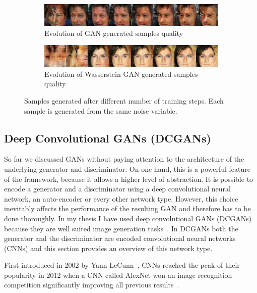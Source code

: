 \begin{figure}
  \begin{subfigure}[b]{\textwidth}
    \includegraphics[width=\textwidth]{figures/gan_progress}
    \caption{Evolution of GAN generated samples quality}
    \label{fig:gan_evolution}
  \end{subfigure}
  \begin{subfigure}[b]{\textwidth}
    \includegraphics[width=\textwidth]{figures/wgan_progress}
    \caption{Evolution of Wasserstein GAN generated samples quality}
    \label{fig:gan_evolution}
  \end{subfigure}
  \caption{Samples generated after different number of training steps. Each sample is generated from the same noise variable.}
  \label{fig:samples_evolution}
\end{figure}

\subsection{Deep Convolutional GANs (DCGANs)}
So far we discussed GANs without paying attention to the architecture of the underlying generator and discriminator. On one hand, this is a powerful feature of the framework, because it allows a higher level of abstraction. It is possible to encode a generator and a discriminator using a deep convolutional neural network, an auto-encoder or every other network type. However, this choice inevitably affects the performance of the resulting GAN and therefore has to be done thoroughly. In my thesis I have used deep convolutional GANs (DCGANs) because they are well suited image generation tasks~\cite{dcgan}. In DCGANs both the generator and the discriminator are encoded convolutional neural networks (CNNs) and this section provides an overview of this network type. 

First introduced in 2002 by Yann LeCunn~\cite{lecun}, CNNs reached the peak of their popularity in 2012 when a CNN called AlexNet won an image recognition competition significantly improving all previous results~\cite{alexnet}. 



